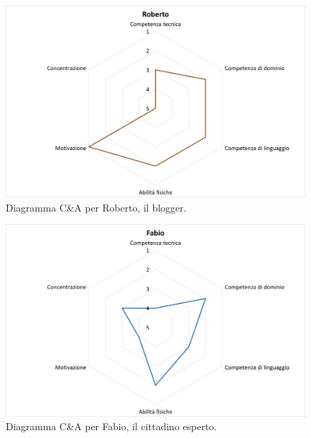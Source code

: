 \begin{figure}[!h]
    \centering
    \includegraphics[width=0.5\columnwidth]{assets/images/proposta-design/caos/roberto}
    \caption{Diagramma C\&A per Roberto, il blogger.}
\end{figure}

\begin{figure}[!h]
    \centering
    \includegraphics[width=0.5\columnwidth]{assets/images/proposta-design/caos/fabio}
    \caption{Diagramma C\&A per Fabio, il cittadino esperto.}
\end{figure}

